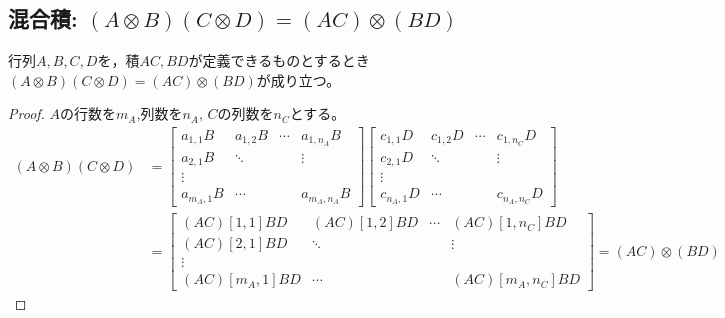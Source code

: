         \subsection{混合積: \texorpdfstring{$(A\otimes B)(C\otimes D) = (AC)\otimes(BD)$}{(A⊗B)(C⊗D) = (AC)⊗(BD)}}
            \begin{shadebox}
                行列$A,B,C,D$を，積$AC, BD$が定義できるものとするとき$(A\otimes B)(C\otimes D) = (AC)\otimes(BD)$が成り立つ。
            \end{shadebox}
            \begin{proof}
                $A$の行数を$m_A$,列数を$n_A$, $C$の列数を$n_C$とする。
                \begin{align*}
                    (A\otimes B)(C\otimes D) &= \begin{bmatrix}
                        a_{1,1}B & a_{1,2}B & \cdots & a_{1,n_A}B \\
                        a_{2,1}B & \ddots & & \vdots \\
                        \vdots \\
                        a_{m_A, 1}B & \cdots & & a_{m_A, n_A}B
                    \end{bmatrix}
                    \begin{bmatrix}
                        c_{1,1}D & c_{1,2}D & \cdots & c_{1,n_C}D \\
                        c_{2,1}D & \ddots & & \vdots \\
                        \vdots \\
                        c_{n_A, 1}D & \cdots & & c_{n_A, n_C}D
                    \end{bmatrix} \\
                    &= \begin{bmatrix}
                        (AC)[1,1]BD & (AC)[1,2]BD & \cdots & (AC)[1,n_C]BD \\
                        (AC)[2,1]BD & \ddots & & \vdots \\
                        \vdots \\
                        (AC)[m_A,1]BD & \cdots & & (AC)[m_A,n_C]BD
                    \end{bmatrix} = (AC)\otimes(BD)
                \end{align*}
            \end{proof}
